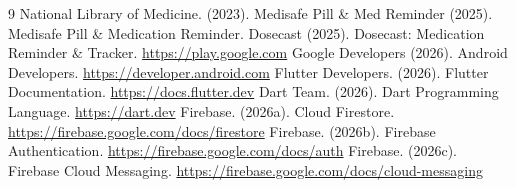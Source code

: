 \documentclass[12pt, a4paper, oneside]{report}
\begin{document}


\newpage
\tableofcontents
\newpage
\listoftables
\newpage
\listoffigures









\newpage
{}
\begin{thebibliography}{9}
 National Library of Medicine. (2023).
 Medisafe Pill \& Med Reminder (2025). Medisafe Pill \& Medication Reminder.
 Dosecast (2025). Dosecast: Medication Reminder \& Tracker. \url{https://play.google.com}
 Google Developers (2026). Android Developers. \url{https://developer.android.com}
 Flutter Developers. (2026). Flutter Documentation. \url{https://docs.flutter.dev}
 Dart Team. (2026). Dart Programming Language. \url{https://dart.dev}
 Firebase. (2026a). Cloud Firestore. \url{https://firebase.google.com/docs/firestore}
 Firebase. (2026b). Firebase Authentication. \url{https://firebase.google.com/docs/auth}
 Firebase. (2026c). Firebase Cloud Messaging. \url{https://firebase.google.com/docs/cloud-messaging}
\end{thebibliography}


\end{document}
